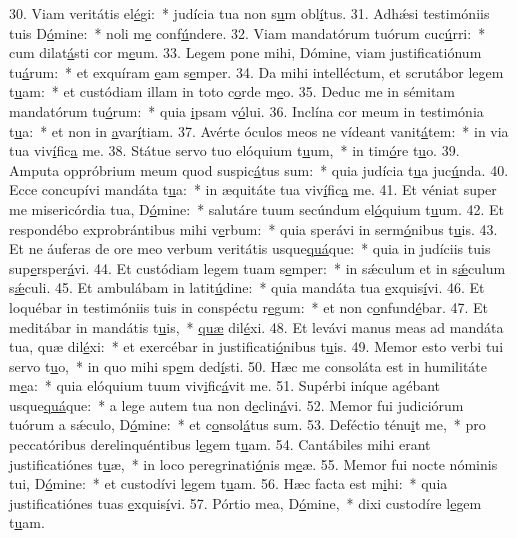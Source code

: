 30. Viam veritátis el\uline{é}gi:~* judícia tua non s\uline{u}m obl\uline{í}tus.
31. Adhǽsi testimóniis tuis D\uline{ó}mine:~* noli m\uline{e} conf\uline{ú}ndere.
32. Viam mandatórum tuórum cuc\uline{ú}rri:~* cum dilat\uline{á}sti cor m\uline{e}um.
33. Legem pone mihi, Dómine, viam justificatiónum tu\uline{á}rum:~* et exquíram \uline{e}am s\uline{e}mper.
34. Da mihi intelléctum, et scrutábor legem t\uline{u}am:~* et custódiam illam in toto c\uline{o}rde m\uline{e}o.
35. Deduc me in sémitam mandatórum tu\uline{ó}rum:~* quia \uline{i}psam v\uline{ó}lui.
36. Inclína cor meum in testimónia t\uline{u}a:~* et non in \uline{a}var\uline{í}tiam.
37. Avérte óculos meos ne vídeant vanit\uline{á}tem:~* in via tua viv\uline{í}fic\uline{a} me.
38. Státue servo tuo elóquium t\uline{u}um,~* in tim\uline{ó}re t\uline{u}o.
39. Amputa oppróbrium meum quod suspic\uline{á}tus sum:~* quia judícia t\uline{u}a juc\uline{ú}nda.
40. Ecce concupívi mandáta t\uline{u}a:~* in æquitáte tua viv\uline{í}fic\uline{a} me.
41. Et véniat super me misericórdia tua, D\uline{ó}mine:~* salutáre tuum secúndum el\uline{ó}quium t\uline{u}um.
42. Et respondébo exprobrántibus mihi v\uline{e}rbum:~* quia sperávi in serm\uline{ó}nibus t\uline{u}is.
43. Et ne áuferas de ore meo verbum veritátis usque\uline{quá}que:~* quia in judíciis tuis sup\uline{e}rsper\uline{á}vi.
44. Et custódiam legem tuam s\uline{e}mper:~* in sǽculum et in s\uline{ǽ}culum s\uline{ǽ}culi.
45. Et ambulábam in latit\uline{ú}dine:~* quia mandáta tua \uline{e}xquis\uline{í}vi.
46. Et loquébar in testimóniis tuis in conspéctu r\uline{e}gum:~* et non c\uline{o}nfund\uline{é}bar.
47. Et meditábar in mandátis t\uline{u}is,~* \uline{quæ} dil\uline{é}xi.
48. Et levávi manus meas ad mandáta tua, quæ dil\uline{é}xi:~* et exercébar in justificati\uline{ó}nibus t\uline{u}is.
49. Memor esto verbi tui servo t\uline{u}o,~* in quo mihi sp\uline{e}m ded\uline{í}sti.
50. Hæc me consoláta est in humilitáte m\uline{e}a:~* quia elóquium tuum viv\uline{i}fic\uline{á}vit me.
51. Supérbi iníque agébant usque\uline{quá}que:~* a lege autem tua non d\uline{e}clin\uline{á}vi.
52. Memor fui judiciórum tuórum a sǽculo, D\uline{ó}mine:~* et c\uline{o}nsol\uline{á}tus sum.
53. Deféctio ténu\uline{i}t me,~* pro peccatóribus derelinquéntibus l\uline{e}gem t\uline{u}am.
54. Cantábiles mihi erant justificatiónes t\uline{u}æ,~* in loco peregrinati\uline{ó}nis m\uline{e}æ.
55. Memor fui nocte nóminis tui, D\uline{ó}mine:~* et custodívi l\uline{e}gem t\uline{u}am.
56. Hæc facta est m\uline{i}hi:~* quia justificatiónes tuas \uline{e}xquis\uline{í}vi.
57. Pórtio mea, D\uline{ó}mine,~* dixi custodíre l\uline{e}gem t\uline{u}am.
